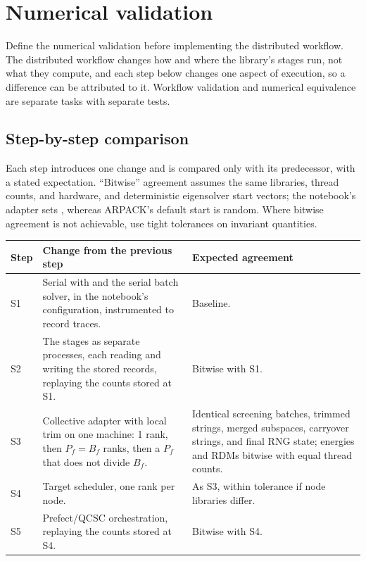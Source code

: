 \documentclass[11pt,a4paper]{article}
\newcommand{\code}[1]{\texttt{\detokenize{#1}}}
\begin{document}
\section{Numerical validation}
\label{sec:validation}

Define the numerical validation before implementing the distributed workflow.
The distributed workflow changes how and where the library's stages run, not
what they compute, and each step below changes one aspect of execution, so a
difference can be attributed to it. Workflow validation and numerical
equivalence are separate tasks with separate tests.

\subsection{Step-by-step comparison}

Each step introduces one change and is compared only with its predecessor, with
a stated expectation. ``Bitwise'' agreement assumes the same libraries, thread
counts, and hardware, and deterministic eigensolver start vectors; the
notebook's adapter sets \code{v0}, whereas ARPACK's default start is random.
Where bitwise agreement is not achievable, use tight tolerances on invariant
quantities.

\begin{center}
\small
\begin{tabularx}{\textwidth}{@{}lLL@{}}
\toprule
Step & Change from the previous step & Expected agreement \\
\midrule
S1 & Serial \code{run_lassqd} with \code{TrimPolicy} and the serial batch
solver, in the notebook's configuration, instrumented to record traces. &
Baseline. \\
S2 & The stages as separate processes, each reading and writing the stored
records, replaying the counts stored at S1. & Bitwise with S1. \\
S3 & Collective adapter with local trim on one machine: 1 rank, then
$P_f = B_f$ ranks, then a $P_f$ that does not divide $B_f$. & Identical
screening batches, trimmed strings, merged subspaces, carryover strings, and
final RNG state; energies and RDMs bitwise with equal thread counts. \\
S4 & Target scheduler, one rank per node. & As S3, within tolerance if node
libraries differ. \\
S5 & Prefect/QCSC orchestration, replaying the counts stored at S4. & Bitwise
with S4. \\
\bottomrule
\end{tabularx}
\end{center}
\end{document}
